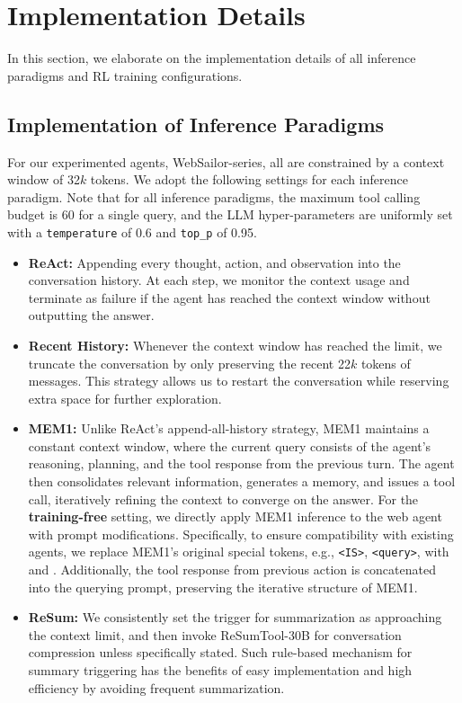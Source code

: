 \clearpage
\newpage
\section{Implementation Details}\label{appendix:implementation}

In this section, we elaborate on the implementation details of all inference paradigms and RL training configurations.

\subsection{Implementation of Inference Paradigms}

For our experimented agents, WebSailor-series, all are constrained by a context window of 32$k$ tokens. We adopt the following settings for each inference paradigm. Note that for all inference paradigms, the maximum tool calling budget is 60 for a single query, and the LLM hyper-parameters are uniformly set with a \texttt{temperature} of 0.6 and \texttt{top\_p} of 0.95.

\begin{itemize}
    \item \textbf{ReAct:} Appending every thought, action, and observation into the conversation history. At each step, we monitor the context usage and terminate as failure if the agent has reached the context window without outputting the answer.
    \item \textbf{Recent History:} Whenever the context window has reached the limit, we truncate the conversation by only preserving the recent 22$k$ tokens of messages. This strategy allows us to restart the conversation while reserving extra space for further exploration.
    \item \textbf{MEM1:} Unlike ReAct's append-all-history strategy, MEM1 maintains a constant context window, where the current query consists of the agent's reasoning, planning, and the tool response from the previous turn. The agent then consolidates relevant information, generates a memory, and issues a tool call, iteratively refining the context to converge on the answer. For the \textbf{training-free} setting, we directly apply MEM1 inference to the web agent with prompt modifications. Specifically, to ensure compatibility with existing agents, we replace MEM1's original special tokens, e.g., \texttt{<IS>}, \texttt{<query>}, with \lightthink{} and \lightsearch{}. Additionally, the tool response from previous action is concatenated into the querying prompt, preserving the iterative structure of MEM1.
    \item \textbf{ReSum:} We consistently set the trigger for summarization as approaching the context limit, and then invoke ReSumTool-30B for conversation compression unless specifically stated. Such rule-based mechanism for summary triggering has the benefits of easy implementation and high efficiency by avoiding frequent summarization. 
\end{itemize}



